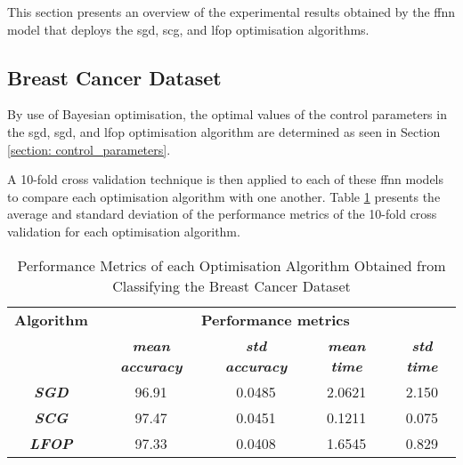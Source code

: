 \documentclass[10pt, conference]{IEEEtran}
\begin{document}
This section presents an overview of the experimental results obtained by the \acrshort{ffnn} model that deploys the
\acrshort{sgd}, \acrshort{scg}, and \acrshort{lfop} optimisation algorithms.

\subsection{Breast Cancer Dataset}

By use of Bayesian optimisation, the optimal values of the control parameters in the
\acrshort{sgd}, \acrshort{sgd}, and \acrshort{lfop} optimisation algorithm are determined as seen in
Section \ref{section: control_parameters}.

A 10-fold cross validation technique is then applied to each of these \acrshort{ffnn} models to compare each
optimisation algorithm with one another. Table \ref{table: BC_performance_metrics} presents the average
and standard deviation of the performance metrics of the 10-fold cross validation for each optimisation algorithm.
\begin{table}[H]
    \caption{Performance Metrics of each Optimisation Algorithm Obtained from Classifying the Breast Cancer Dataset}
    \begin{center}
        \begin{tabular}{|c||c|c|c|c|}
            \hline
            \textbf{Algorithm}&\multicolumn{4}{|c|}{\textbf{Performance metrics}} \\
            \cline{2-5}
                        & \textbf{\textit{mean accuracy}} & \textbf{\textit{std accuracy}} & \textbf{\textit{mean time}} & \textbf{\textit{std time}}\\
            \hline
            \textbf{\textit{SGD}}  & 96.91 & 0.0485 & 2.0621 & 2.150\\
            \textbf{\textit{SCG}}  & 97.47 & 0.0451 & 0.1211 & 0.075\\
            \textbf{\textit{LFOP}} & 97.33 & 0.0408 & 1.6545 & 0.829\\
            \hline
        \end{tabular}
    \end{center}
    \label{table: BC_performance_metrics}
\end{table}
\end{document}
